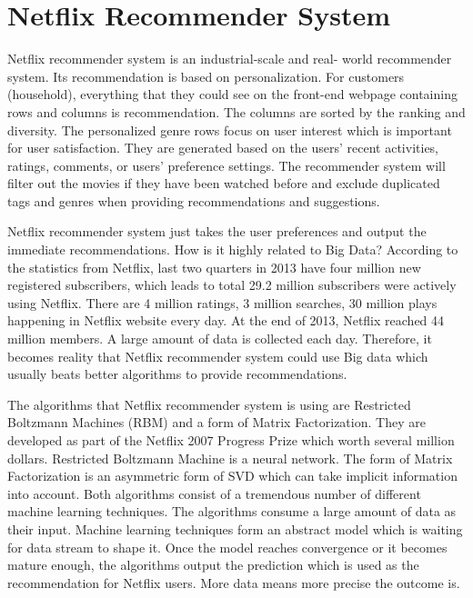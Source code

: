 \documentclass[sigconf]{acmart}
\begin{document}
\section{Netflix Recommender System}
 Netflix recommender system is an industrial-scale and real- world recommender system. Its recommendation is based on personalization. For customers (household), everything that they could see on the front-end webpage containing rows and columns is recommendation.  The columns are sorted by the ranking and diversity. The personalized genre rows focus on user interest which is important for user satisfaction. They are generated based on the users’ recent activities, ratings, comments, or users’ preference settings. The recommender system will filter out the movies if they have been watched before and exclude duplicated tags and genres when providing recommendations and suggestions\cite{Reco1}. 
\par
Netflix recommender system just takes the user preferences and output the immediate recommendations. How is it highly related to Big Data? According to the statistics from Netflix, last two quarters in 2013 have four million new registered subscribers, which leads to total 29.2 million subscribers were actively using Netflix. There are 4 million ratings, 3 million searches, 30 million plays happening in Netflix website every day. At the end of 2013, Netflix reached 44 million members\cite{Reco1}. A large amount of data is collected each day. Therefore, it becomes reality that Netflix recommender system could use Big data which usually beats better algorithms to provide recommendations.
\par
The algorithms that Netflix recommender system is using are Restricted Boltzmann Machines (RBM) and a form of Matrix Factorization. They are developed as part of the Netflix 2007 Progress Prize which worth several million dollars. Restricted Boltzmann Machine is a neural network. The form of Matrix Factorization is an asymmetric form of SVD which can take implicit information into account\cite{Netflix}. Both algorithms consist of a tremendous number of different machine learning techniques. The algorithms consume a large amount of data as their input. Machine learning techniques form an abstract model which is waiting for data stream to shape it. Once the model reaches convergence or it becomes mature enough, the algorithms output the prediction which is used as the recommendation for Netflix users. More data means more precise the outcome is.
\par
\end{document}
